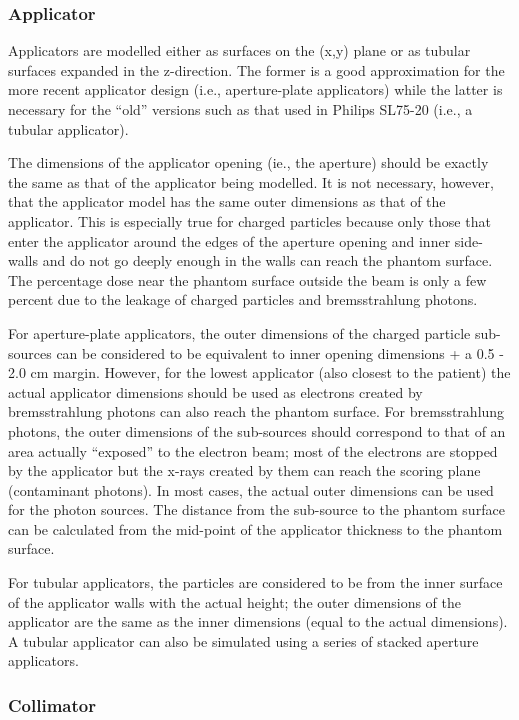 \documentclass[12pt,twoside]{article}
\begin{document}
\subsubsection{Applicator}

Applicators are modelled either as surfaces on the (x,y) plane or as tubular surfaces expanded in the z-direction. The former is a good approximation for the more recent applicator design (i.e., aperture-plate applicators) while the latter is necessary for the ``old'' versions such as that used in Philips SL75-20 (i.e., a
tubular applicator).

The dimensions of the applicator opening (ie., the aperture) should be
exactly the same as that of the applicator being modelled. It is not
necessary, however, that the applicator model has the same outer
dimensions as that of the applicator. This is especially true for charged
particles because only those that enter the applicator around the edges of
the aperture opening and inner side-walls and do not go deeply enough in
the walls can reach the phantom surface. The percentage dose near the
phantom surface outside the beam is only a few percent due to the leakage
of charged particles and bremsstrahlung photons.

For aperture-plate applicators, the outer dimensions of the charged particle sub-sources can be considered to be equivalent to inner opening dimensions + a 0.5 - 2.0 cm margin. However, for the lowest applicator (also closest to the patient) the actual applicator dimensions should be used as electrons created by bremsstrahlung photons can also reach the phantom surface. For bremsstrahlung photons, the outer dimensions of the sub-sources should correspond to that of an area actually ``exposed'' to the electron beam; most of the electrons are stopped by the applicator but the x-rays created by them can reach the scoring plane (contaminant photons). In most cases, the actual outer dimensions can be used for the photon sources. The distance from the sub-source to the phantom surface can be calculated from the mid-point of the applicator thickness to the phantom surface.

For tubular applicators, the particles are considered to be from the inner surface of the applicator walls with the actual height; the outer dimensions of the applicator are the same as the inner dimensions (equal to the actual dimensions). A tubular applicator can also be simulated using a series of stacked aperture applicators.

\subsubsection{Collimator}
\end{document}
